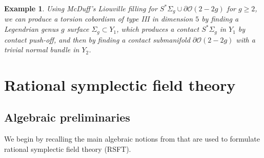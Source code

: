 \documentclass[11pt]{amsart}
\numberwithin{equation}{section}
\newtheorem{example}[theorem]{\textbf{Example}}
\def\cO{{\mathcal O}}
\begin{document}
\begin{example}
    Using McDuff's Liouville filling for $S^*\Sigma_g\cup \partial \cO(2-2g)$ for $g\ge 2$, we can produce a torsion cobordism of type III in dimension $5$ by finding a Legendrian genus $g$ surface $\Sigma_g\subset Y_1$, which produces a contact $S^*\Sigma_g$ in $Y_1$ by contact push-off, and then by finding a contact submanifold $\partial \cO(2-2g)$ with a trivial normal bundle in $Y_2$.
\end{example}
\section{Rational symplectic field theory}\label{s:SFT}
\subsection{Algebraic preliminaries}\label{ss:algebra}
We begin by recalling the main algebraic notions from \cite{moreno2024landscape,moreno2024rsft} that are used to formulate rational symplectic field theory (RSFT). 
\end{document}
